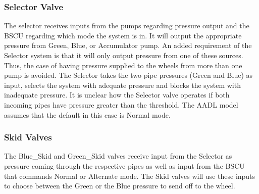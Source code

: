 \subsubsection{Selector Valve}
The selector receives inputs from the pumps regarding pressure output and the BSCU regarding which mode the system is in. It will output the appropriate pressure from Green, Blue, or Accumulator pump. An added requirement of the Selector system is that it will only output pressure from one of these sources. Thus, the case of having pressure supplied to the wheels from more than one pump is avoided. The Selector takes the two pipe pressures (Green and Blue) as input, selects the system with adequate pressure and blocks the system with inadequate pressure. It is unclear how the Selector valve operates if both incoming pipes have pressure greater than the threshold. The AADL model assumes that the default in this case is Normal mode. 

\subsubsection{Skid Valves}
The Blue\_Skid and Green\_Skid valves receive input from the Selector as pressure coming through the respective pipes as well as input from the BSCU that commands Normal or Alternate mode. The Skid valves will use these inputs to choose between the Green or the Blue pressure to send off to the wheel. 



